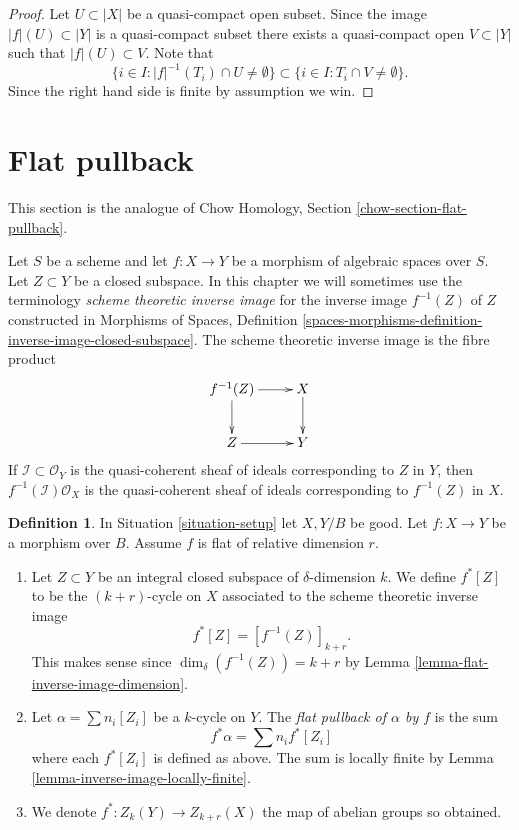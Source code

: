 \documentclass{stacks-project}
\theoremstyle{plain}
\theoremstyle{definition}
\newtheorem{definition}[subsection]{Definition}
\theoremstyle{remark}
\numberwithin{equation}{subsection}
\begin{document}
\begin{proof}
Let $U \subset |X|$ be a quasi-compact open subset.
Since the image $|f|(U) \subset |Y|$ is a quasi-compact subset
there exists a quasi-compact open $V \subset |Y|$ such that
$|f|(U) \subset V$. Note that
$$
\{i \in I : |f|^{-1}(T_i) \cap U \not = \emptyset \}
\subset
\{i \in I : T_i \cap V \not = \emptyset \}.
$$
Since the right hand side is finite by assumption we win.
\end{proof}

















\section{Flat pullback}
\label{section-flat-pullback}

\noindent
This section is the analogue of
Chow Homology, Section \ref{chow-section-flat-pullback}.

\medskip\noindent
Let $S$ be a scheme and let $f : X \to Y$ be a morphism of algebraic
spaces over $S$. Let $Z \subset Y$ be a closed subspace.
In this chapter we will sometimes use the terminology
{\it scheme theoretic inverse image} for the inverse image
$f^{-1}(Z)$ of $Z$ constructed in Morphisms of Spaces, Definition
\ref{spaces-morphisms-definition-inverse-image-closed-subspace}.
The scheme theoretic inverse image is the fibre product
$$
\xymatrix{
f^{-1}(Z) \ar[r] \ar[d] & X \ar[d] \\
Z \ar[r] & Y
}
$$
If $\mathcal{I} \subset \mathcal{O}_Y$ is the quasi-coherent sheaf of ideals
corresponding to $Z$ in $Y$, then $f^{-1}(\mathcal{I})\mathcal{O}_X$ is the
quasi-coherent sheaf of ideals corresponding to $f^{-1}(Z)$ in $X$.

\begin{definition}
\label{definition-flat-pullback}
In Situation \ref{situation-setup} let $X, Y/B$ be good.
Let $f : X \to Y$ be a morphism over $B$.
Assume $f$ is flat of relative dimension $r$.
\begin{enumerate}
\item Let $Z \subset Y$ be an integral closed subspace of
$\delta$-dimension $k$. We define $f^*[Z]$ to be the
$(k+r)$-cycle on $X$ associated to the scheme theoretic inverse image
$$
f^*[Z] = [f^{-1}(Z)]_{k+r}.
$$
This makes sense since $\dim_\delta(f^{-1}(Z)) = k + r$
by Lemma \ref{lemma-flat-inverse-image-dimension}.
\item Let $\alpha = \sum n_i [Z_i]$ be
a $k$-cycle on $Y$. The {\it flat pullback of $\alpha$ by $f$}
is the sum
$$
f^* \alpha = \sum n_i f^*[Z_i]
$$
where each $f^*[Z_i]$ is defined as above.
The sum is locally finite by Lemma \ref{lemma-inverse-image-locally-finite}.
\item We denote $f^* : Z_k(Y) \to Z_{k + r}(X)$ the map of abelian
groups so obtained.
\end{enumerate}
\end{definition}
\end{document}
